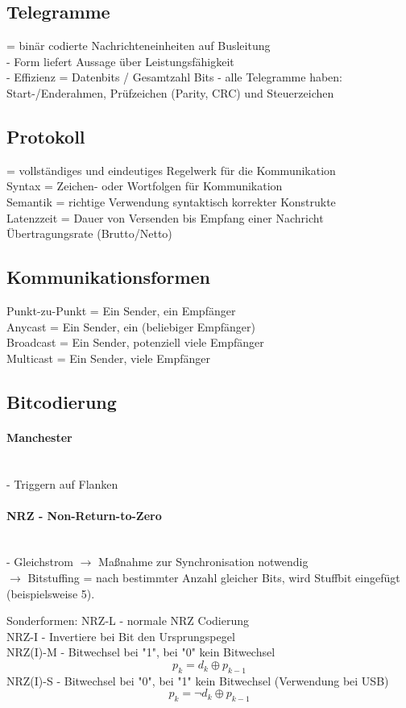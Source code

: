 \documentclass{article}
\newcommand{\myparagraph}[1]{\paragraph{#1}\mbox{}\\}
\newcommand{\follows}{$\rightarrow$ }
\newcommand*\xor{\mathbin{\oplus}}
\begin{document}
	\subsection{Telegramme}
	= binär codierte Nachrichteneinheiten auf Busleitung \\
	- Form liefert Aussage über Leistungsfähigkeit \\
	- Effizienz = Datenbits / Gesamtzahl Bits
	- alle Telegramme haben: Start-/Enderahmen, Prüfzeichen (Parity, CRC) und Steuerzeichen
	
	\subsection{Protokoll}
	= vollständiges und eindeutiges Regelwerk für die Kommunikation \\
	Syntax = Zeichen- oder Wortfolgen für Kommunikation \\
	Semantik = richtige Verwendung syntaktisch korrekter Konstrukte \\
	Latenzzeit = Dauer von Versenden bis Empfang einer Nachricht \\
	Übertragungsrate (Brutto/Netto)
	
	\subsection{Kommunikationsformen}
	Punkt-zu-Punkt = Ein Sender, ein Empfänger \\
	Anycast = Ein Sender, ein (beliebiger Empfänger) \\
	Broadcast = Ein Sender, potenziell viele Empfänger \\
	Multicast = Ein Sender, viele Empfänger
	
	\subsection{Bitcodierung}
	\myparagraph{Manchester}
	- Triggern auf Flanken
	
	\myparagraph{NRZ - Non-Return-to-Zero}
	- Gleichstrom \follows Maßnahme zur Synchronisation notwendig \\
	\follows Bitstuffing = nach bestimmter Anzahl gleicher Bits, wird Stuffbit eingefügt (beispielsweise 5).
	
	Sonderformen:
	NRZ-L - normale NRZ Codierung \\
	NRZ-I - Invertiere bei Bit den Ursprungspegel \\
	NRZ(I)-M - Bitwechsel bei "1", bei "0" kein Bitwechsel
	$$ p_{k} = d_{k} \xor p_{k-1} $$
	NRZ(I)-S - Bitwechsel bei "0", bei "1" kein Bitwechsel (Verwendung bei USB)
	$$ p_{k} = \neg d_{k} \xor p_{k-1} $$
	
\end{document}
